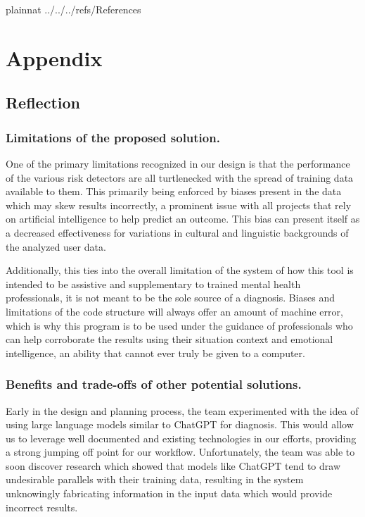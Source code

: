 \documentclass[12pt, titlepage]{article}
\begin{document}
 

\newpage

 {plainnat}
 {../../../refs/References}

\newpage

\section{Appendix} \label{Appendix}

\subsection{Reflection}

\subsubsection{Limitations of the proposed solution.}
One of the primary limitations recognized in our design is that the performance of the various risk detectors are all turtlenecked with the spread of training data available to them. This primarily being enforced by biases present in the data which may skew results incorrectly, a prominent issue with all projects that rely on artificial intelligence to help predict an outcome. This bias can present itself as a decreased effectiveness for variations in cultural and linguistic backgrounds of the analyzed user data.

Additionally, this ties into the overall limitation of the system of how this tool is intended to be assistive and supplementary to trained mental health professionals, it is not meant to be the sole source of a diagnosis. Biases and limitations of the code structure will always offer an amount of machine error, which is why this program is to be used under the guidance of professionals who can help corroborate the results using their situation context and emotional intelligence, an ability that cannot ever truly be given to a computer.  

\subsubsection{Benefits and trade-offs of other potential solutions.}
Early in the design and planning process, the team experimented with the idea of using large language models similar to ChatGPT for diagnosis. This would allow us to leverage well documented and existing technologies in our efforts, providing a strong jumping off point for our workflow. Unfortunately, the team was able to soon discover research which showed that models like ChatGPT tend to draw undesirable parallels with their training data, resulting in the system unknowingly fabricating information in the input data which would provide incorrect results.
\end{document}
